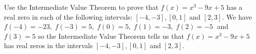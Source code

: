 {Use the Intermediate Value Theorem to prove that $f(x) = x^{3} - 9x + 5$ has a real zero in each of the following intervals: $[-4, -3], [0, 1]$ and $[2, 3]$.
}
{We have $f(-4)=-23,\; f(-3)=5,\; f(0)=5,\; f(1)=-3,\; f(2)=-5\;$ and $f(3)=5$ so the Intermediate Value Theorem tells us that $f(x) = x^{3} - 9x + 5$ has real zeros in the intervals $[-4, -3], [0, 1]$ and $[2, 3]$.}